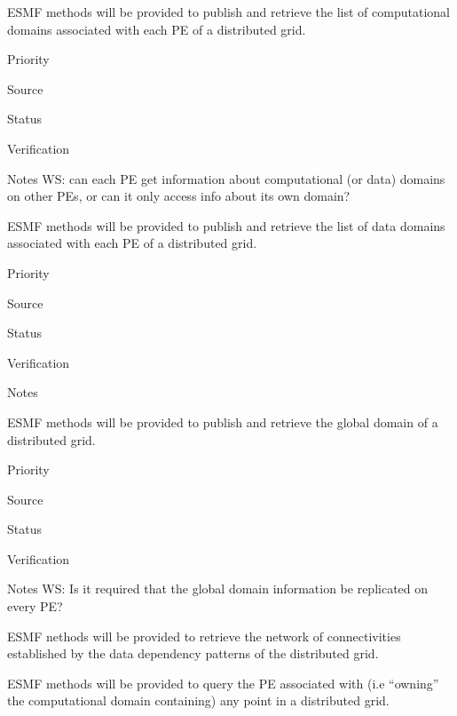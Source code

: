 
ESMF methods will be provided to publish and retrieve the list of
computational domains associated with each PE of a distributed grid.

\begin{reqlist}
\item[Priority]
\item[Source]
\item[Status]
\item[Verification]
\item[Notes]  WS: can each PE get information about 
computational (or data) domains on other PEs, or can it only access 
info about its own domain?
\end{reqlist}


ESMF methods will be provided to publish and retrieve the list of
data domains associated with each PE of a distributed grid.

\begin{reqlist}
\item[Priority]
\item[Source]
\item[Status]
\item[Verification]
\item[Notes]
\end{reqlist}


ESMF methods will be provided to publish and retrieve the global
domain of a distributed grid.

\begin{reqlist}
\item[Priority]
\item[Source]
\item[Status]
\item[Verification]
\item[Notes] WS: Is it required that the global domain information 
be replicated on every PE?

\end{reqlist}


ESMF nethods will be provided to retrieve the network of
connectivities established by the data dependency patterns of the
distributed grid.


ESMF methods will be provided to query the PE associated with (i.e
``owning'' the computational domain containing) any point in a
distributed grid.

